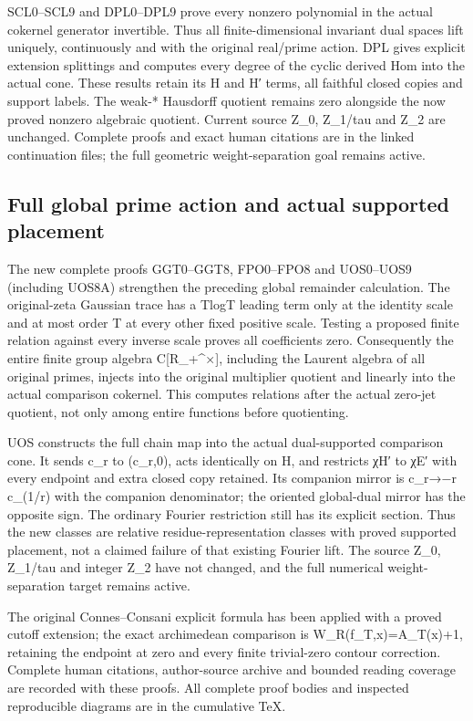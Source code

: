 SCL0--SCL9 and DPL0--DPL9 prove every nonzero polynomial in the actual
cokernel generator invertible. Thus all finite-dimensional invariant
dual spaces lift uniquely, continuously and with the original real/prime
action. DPL gives explicit extension splittings and computes every
degree of the cyclic derived Hom into the actual cone. These results
retain its H and H′ terms, all faithful closed copies and support
labels. The weak-* Hausdorff quotient remains zero alongside the now
proved nonzero algebraic quotient. Current source Z\_0, Z\_1/tau and
Z\_2 are unchanged. Complete proofs and exact human citations are in the
linked continuation files; the full geometric weight-separation goal
remains active.

\subsection{Full global prime action and actual supported
placement}\label{full-global-prime-action-and-actual-supported-placement}

The new complete proofs GGT0--GGT8, FPO0--FPO8 and UOS0--UOS9 (including
UOS8A) strengthen the preceding global remainder calculation. The
original-zeta Gaussian trace has a TlogT leading term only at the
identity scale and at most order T at every other fixed positive scale.
Testing a proposed finite relation against every inverse scale proves
all coefficients zero. Consequently the entire finite group algebra
C{[}R\_+\^{}×{]}, including the Laurent algebra of all original primes,
injects into the original multiplier quotient and linearly into the
actual comparison cokernel. This computes relations after the actual
zero-jet quotient, not only among entire functions before quotienting.

UOS constructs the full chain map into the actual dual-supported
comparison cone. It sends c\_r to (c\_r,0), acts identically on H, and
restricts χH′ to χE′ with every endpoint and extra closed copy retained.
Its companion mirror is c\_r→−r c\_(1/r) with the companion denominator;
the oriented global-dual mirror has the opposite sign. The ordinary
Fourier restriction still has its explicit section. Thus the new classes
are relative residue-representation classes with proved supported
placement, not a claimed failure of that existing Fourier lift. The
source Z\_0, Z\_1/tau and integer Z\_2 have not changed, and the full
numerical weight-separation target remains active.

The original Connes--Consani explicit formula has been applied with a
proved cutoff extension; the exact archimedean comparison is
W\_R(f\_T,x)=A\_T(x)+1, retaining the endpoint at zero and every finite
trivial-zero contour correction. Complete human citations, author-source
archive and bounded reading coverage are recorded with these proofs. All
complete proof bodies and inspected reproducible diagrams are in the
cumulative TeX.

